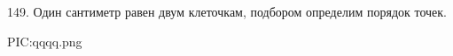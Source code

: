 149. Один сантиметр равен двум клеточкам, подбором определим порядок точек.
\begin{center}
{{PIC:qqqq.png}}
\end{center}
